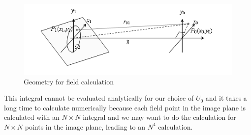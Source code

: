 \documentclass[12pt]{revtex4-1}
\begin{document}
\begin{figure}[tbh]
    \includegraphics{Huygens-Fresnel_field.PNG}
    \caption{Geometry for field calculation}
\end{figure}

This integral cannot be evaluated analytically for our choice of $U_0$ and it takes a long time to calculate numerically because each field point in the image plane is calculated with an $N\times N$ integral and we may want to do the calculation for $N\times N$ points in the image plane, leading to an $N^4$ calculation.
\end{document}
